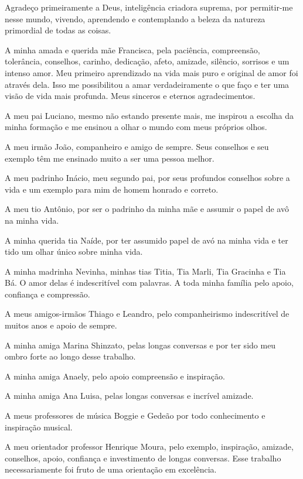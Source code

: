 \begin{agradecimentos}

Agradeço primeiramente a Deus, inteligência criadora suprema, por permitir-me nesse mundo, vivendo, aprendendo e contemplando a beleza da natureza primordial de todas as coisas.

A minha amada e querida mãe Francisca, pela paciência, compreensão, tolerância, conselhos, carinho, dedicação, afeto, amizade, silêncio, sorrisos e um intenso amor. Meu primeiro aprendizado na vida mais puro e original de amor foi através dela. Isso me possibilitou a amar verdadeiramente o que faço e ter uma visão de vida mais profunda. Meus sinceros e eternos agradecimentos.

A meu pai Luciano, mesmo não estando presente mais, me inspirou a escolha da minha formação e me ensinou a olhar o mundo com meus próprios olhos.

A meu irmão João, companheiro e amigo de sempre. Seus conselhos e seu exemplo têm me ensinado muito a ser uma pessoa melhor.

A meu padrinho Inácio, meu segundo pai, por seus profundos conselhos sobre a vida e um exemplo para mim de homem honrado e correto.

A meu tio Antônio, por ser o padrinho da minha mãe e assumir o papel de avô na minha vida.

A minha querida tia Naíde, por ter assumido papel de avó na minha vida e ter tido um olhar único sobre minha vida. 

A minha madrinha Nevinha, minhas tias Titia, Tia Marli, Tia Gracinha e Tia Bá. O amor delas é indescritível com palavras. A toda minha família pelo apoio, confiança e compressão.

A meus amigos-irmãos Thiago e Leandro, pelo companheirismo indescritível de muitos anos e apoio de sempre.

A minha amiga Marina Shinzato, pelas longas conversas e por ter sido meu ombro forte ao longo desse trabalho.

A minha amiga Anaely, pelo apoio compreensão e inspiração.

A minha amiga Ana Luisa, pelas longas conversas e incrível amizade. 

A meus professores de música Boggie e Gedeão por todo conhecimento e inspiração musical. 

A meu orientador professor Henrique Moura, pelo exemplo, inspiração, amizade, conselhos, apoio, confiança e investimento de longas conversas. Esse trabalho necessariamente foi fruto de uma orientação em excelência. 


\end{agradecimentos}

